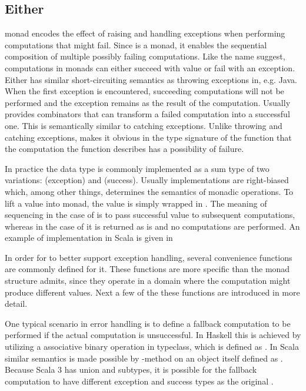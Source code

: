 \subsection{Either} \label{background:monads:either}
 monad encodes the effect of raising and handling exceptions when performing computations that might fail. Since  is a monad, it enables the sequential composition of multiple possibly failing computations. Like the name suggest, computations in  monads can either succeed with value or fail with an exception. Either has similar short-circuiting semantics as throwing exceptions in, e.g. Java. When the first exception is encountered, succeeding computations will not be performed and the exception remains as the result of the computation. Usually  provides combinators that can transform a failed computation into a successful one. This is semantically similar to catching exceptions. Unlike throwing and catching exceptions,  makes it obvious in the type signature of the function that the computation the function describes has a possibility of failure.



In practice the  data type is commonly implemented as a sum type of two variations:  (exception) and  (success). Usually implementations are right-biased which, among other things, determines the semantics of monadic operations. To lift a value into  monad, the value is simply wrapped in . The meaning of sequencing in the case of  is to pass successful value to subsequent computations, whereas in the case of  it is returned as is and no computations are performed. An example of implementation in Scala is given in 

In order for  to better support exception handling, several convenience functions are commonly defined for it. These functions are more specific than the monad structure admits, since they operate in a domain where the computation might produce different values. Next a few of the these functions are introduced in more detail.

One typical scenario in error handling is to define a fallback computation to be performed if the actual computation is unsuccessful. In Haskell this is achieved by utilizing a associative binary operation in  typeclass, which is defined as . In Scala similar semantics is made possible by  -method on an  object itself defined as . Because Scala 3 has union and subtypes, it is possible for the fallback computation to have different exception and success types as the original .

